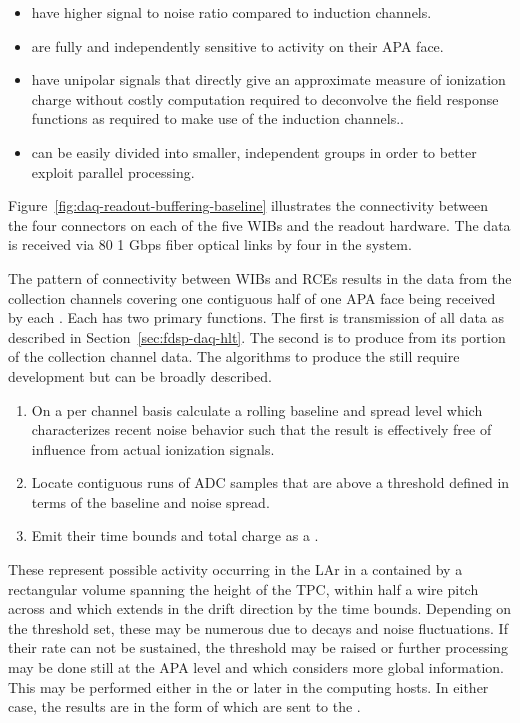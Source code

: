 \begin{itemize}
\item have higher signal to noise ratio compared to induction channels.
\item are fully and independently sensitive to activity on their APA face.
\item have unipolar signals that directly give an approximate measure
  of ionization charge without costly computation required to
  deconvolve the field response functions as required to make use of
  the induction channels..
\item can be easily divided into smaller, independent groups in order
  to better exploit parallel processing.
\end{itemize}


Figure~\ref{fig:daq-readout-buffering-baseline} illustrates the connectivity between the
four connectors on each of the five WIBs and the  readout hardware.
The data is received via 80 1 Gbps fiber optical links by four 
in the   system. 

The pattern of connectivity between WIBs and RCEs results in the data
from the collection channels covering one contiguous half of one APA
face being received by each .
Each  has two primary functions. 
The first is transmission of all data as described in
Section~\ref{sec:fdsp-daq-hlt}. 
The second is to produce  from its portion of the
collection channel data.
The algorithms to produce the  still require
development but can be broadly described.   

\begin{enumerate}
\item On a per channel basis calculate a rolling baseline and spread
  level which characterizes recent noise behavior such that the result
  is effectively free of influence from actual ionization signals.
\item Locate contiguous runs of ADC samples that are above a threshold
  defined in terms of the baseline and noise spread.
\item Emit their time bounds and total charge as a .
\end{enumerate}

These  represent possible activity occurring in
the LAr in a contained by a rectangular volume spanning the height of
the TPC, within half a wire pitch across and which extends in the
drift direction by the time bounds. 
Depending on the threshold set, these  may be
numerous due to  decays and noise fluctuations.
If their rate can not be sustained, the threshold may be raised or
further processing may be done still at the APA level and which
considers more global information.
This may be performed either in the  or later in the
 computing hosts. 
In either case, the results are in the form of 
which are sent to the .

